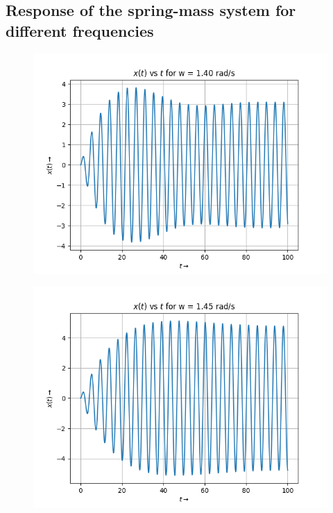 \documentclass[12pt, a4paper]{article}
\begin{document}
\subsection{Response of the spring-mass system for different frequencies}
\vspace*{-0.5cm}
\begin{figure}[H]
    \centering
    \includegraphics[scale = 0.9]{Figure_3.png}
    \label{fig:sample}
\end{figure}
\vspace*{-0.5cm}
\begin{figure}[H]
    \centering
    \includegraphics[scale = 0.9]{Figure_4.png}
    \label{fig:sample}
\end{figure}
\end{document}
